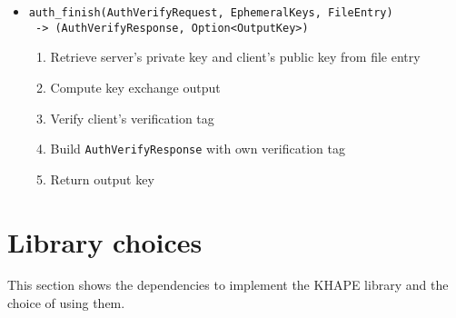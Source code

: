﻿\documentclass[../report.tex]{subfiles}
\begin{document}
\begin{itemize}
 \item \verb|auth_finish(AuthVerifyRequest, EphemeralKeys, FileEntry)|\\ 
       \verb| -> (AuthVerifyResponse, Option<OutputKey>)|
  \begin{enumerate}
    \item Retrieve server's private key and client's public key from file entry
    \item Compute key exchange output
    \item Verify client's verification tag
    \item Build \verb|AuthVerifyResponse| with own verification tag
    \item Return output key
  \end{enumerate}
  
\end{itemize}


% 
% 
% 
% 
% 
% 
% 
% 
% 
% 
% 
% 


\section{Library choices}
This section shows the dependencies to implement the KHAPE library and the choice of using them.
\end{document}
